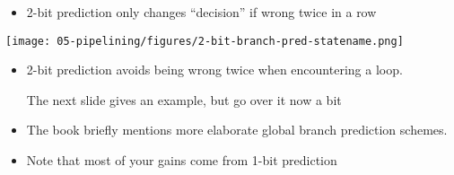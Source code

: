 \begin{frame}[fragile]
\begin{itemize}
\item 2-bit prediction only changes ``decision'' if wrong twice in a row
\end{itemize}
	{\texttt{[image: 05-pipelining/figures/2-bit-branch-pred-statename.png]}}
\BNotes\ifnum{}
\begin{itemize}
\item 2-bit prediction avoids being wrong twice when encountering a loop.

  The next slide gives an example, but go over it now a bit

\item The book briefly mentions more elaborate global branch prediction
  schemes.
\item Note that most of your gains come from 1-bit prediction
\end{itemize}
\fi\ENotes
\end{frame}

